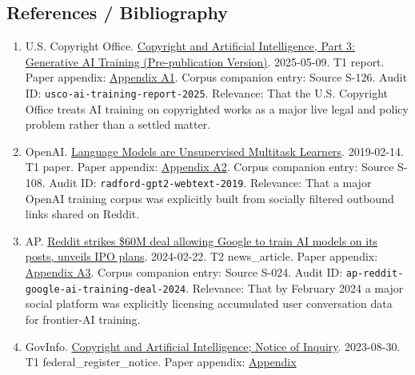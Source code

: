 \documentclass[
  american,
  11pt,
  letterpaper,
]{article}
\providecommand{\tightlist}{%
  \setlength{\itemsep}{0pt}\setlength{\parskip}{0pt}}
\begin{document}
\subsection{References / Bibliography}\label{references-bibliography-4}

\begin{enumerate}
\def\labelenumi{\arabic{enumi}.}
\tightlist
\item
  U.S. Copyright Office.
  \href{https://copyright.gov/ai/Copyright-and-Artificial-Intelligence-Part-3-Generative-AI-Training-Report-Pre-Publication-Version.pdf}{Copyright
  and Artificial Intelligence, Part 3: Generative AI Training
  (Pre-publication Version)}. 2025-05-09. T1 report. Paper appendix:
  \hyperref[ch-04-appendix-a1-copyright-and-artificial-intelligence-part-3-generative-ai-training-pre-publication-version]{Appendix
  A1}. Corpus companion entry: Source S-126. Audit ID:
  \texttt{usco-ai-training-report-2025}. Relevance: That the U.S.
  Copyright Office treats AI training on copyrighted works as a major
  live legal and policy problem rather than a settled matter.
\item
  OpenAI.
  \href{https://cdn.openai.com/better-language-models/language_models_are_unsupervised_multitask_learners.pdf}{Language
  Models are Unsupervised Multitask Learners}. 2019-02-14. T1 paper.
  Paper appendix:
  \hyperref[ch-04-appendix-a2-language-models-are-unsupervised-multitask-learners]{Appendix
  A2}. Corpus companion entry: Source S-108. Audit ID:
  \texttt{radford-gpt2-webtext-2019}. Relevance: That a major OpenAI
  training corpus was explicitly built from socially filtered outbound
  links shared on Reddit.
\item
  AP.
  \href{https://apnews.com/article/a7f131c7cb4225307134ef21d3c6a708}{Reddit
  strikes \$60M deal allowing Google to train AI models on its posts,
  unveils IPO plans}. 2024-02-22. T2 news\_article. Paper appendix:
  \hyperref[ch-04-appendix-a3-reddit-strikes-60m-deal-allowing-google-to-train-ai-models-on-its-posts-unveils-ipo-plans]{Appendix
  A3}. Corpus companion entry: Source S-024. Audit ID:
  \texttt{ap-reddit-google-ai-training-deal-2024}. Relevance: That by
  February 2024 a major social platform was explicitly licensing
  accumulated user conversation data for frontier-AI training.
\item
  GovInfo.
  \href{https://www.govinfo.gov/content/pkg/FR-2023-08-30/pdf/2023-18624.pdf}{Copyright
  and Artificial Intelligence; Notice of Inquiry}. 2023-08-30. T1
  federal\_register\_notice. Paper appendix:
  \hyperref[ch-04-appendix-a4-copyright-and-artificial-intelligence-notice-of-inquiry]{Appendix
}
\end{enumerate}
\end{document}
